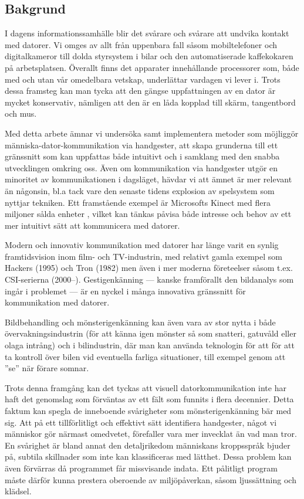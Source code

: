 \documentclass[../rapport_MVEX01-11-05]{subfiles}
\begin{document}
\subsection{Bakgrund}

I dagens informationssamhälle blir det svårare och svårare
att undvika kontakt med datorer. Vi omges av allt från uppenbara fall såsom
mobiltelefoner och digitalkameror till dolda styrsystem i bilar och den
automatiserade kaffekokaren på arbetsplatsen. Överallt finns det apparater
innehållande processorer som, både med och utan vår omedelbara vetskap,
underlättar vardagen vi lever i. Trots dessa framsteg kan man tycka att den
gängse uppfattningen av en dator är mycket konservativ, nämligen att den är en
låda kopplad till skärm, tangentbord och mus.

Med detta arbete ämnar vi undersöka samt implementera metoder som möjliggör
människa-dator-kommunikation via handgester, att skapa grunderna till ett
gränssnitt som kan uppfattas både intuitivt och i samklang med den snabba
utvecklingen omkring oss. Även om kommunikation via handgester utgör en
minoritet av kommunikationen i dagsläget, hävdar vi att ämnet är mer relevant än
någonsin, bl.a tack vare den senaste tidens explosion av spelsystem som nyttjar
tekniken. Ett framstående exempel är Microsofts Kinect med flera miljoner sålda
enheter \cite{kinect1}, vilket kan tänkas påvisa både intresse och behov av ett
mer intuitivt sätt att kommunicera med datorer.

Modern och innovativ kommunikation med datorer har länge varit en
synlig framtidsvision inom film- och TV-industrin, med relativt gamla
exempel som Hackers (1995) och Tron (1982) men även i mer moderna
företeelser såsom t.ex. CSI-serierna (2000--). Gestigenkänning --- kanske
framförallt den bildanalys som ingår i problemet --- är en nyckel i
många innovativa gränssnitt för kommunikation med datorer.

Bildbehandling och mönsterigenkänning kan även vara av stor nytta i både
övervakningsindustrin (för att känna igen mönster så som snatteri,
gatuvåld eller olaga intrång) och 
i bilindustrin, där man kan använda teknologin för att för att ta
kontroll över bilen vid eventuella farliga situationer, till exempel
genom att ''se'' när förare somnar.

Trots denna framgång kan det tyckas att visuell datorkommunikation inte har
haft det genomslag som förväntas av ett fält som funnits i flera decennier.
Detta faktum kan spegla de inneboende svårigheter som mönsterigenkänning bär
med sig. Att på ett tillförlitligt och effektivt sätt identifiera handgester,
något vi människor gör närmast omedvetet, förefaller vara mer invecklat än vad
man tror. En svårighet är bland annat den detaljrikedom människans kroppsspråk
bjuder på, subtila skillnader som inte kan klassificeras med lätthet. Dessa
problem kan även förvärras då programmet får missvisande indata. Ett pålitligt
program måste därför kunna prestera oberoende av miljöpåverkan, såsom ljussättning
och klädsel.
\end{document}
